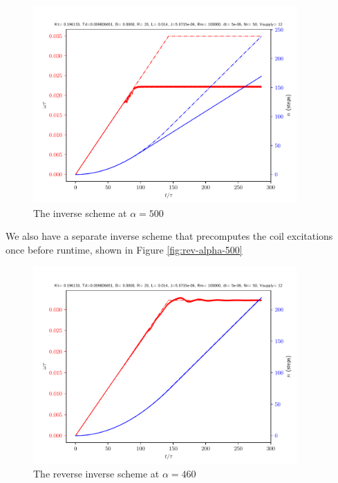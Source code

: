 \documentclass{article}
\begin{document}
\begin{figure}[h!]
  \centering
  \includegraphics[width=0.9\textwidth]{simfigs/fig1-2018-10-20T14-36-07-hybrid-accel-False-alpha-500.pdf}
  \captionsetup{justification=centering}
  \caption{The inverse scheme at $\alpha=500$}
   \label{fig:hyb-alpha-500}
\end{figure}
We also have a separate inverse scheme that precomputes the coil excitations once before runtime, shown in Figure \ref{fig:rev-alpha-500}

\begin{figure}[h!]
  \centering
  \includegraphics[width=0.9\textwidth]{simfigs/fig1-2018-10-20T14-23-39-reverse-alpha-460.pdf}
  \captionsetup{justification=centering}
  \caption{The reverse inverse scheme at $\alpha=460$}
   \label{fig:rev-alpha-460}
\end{figure}
\end{document}
